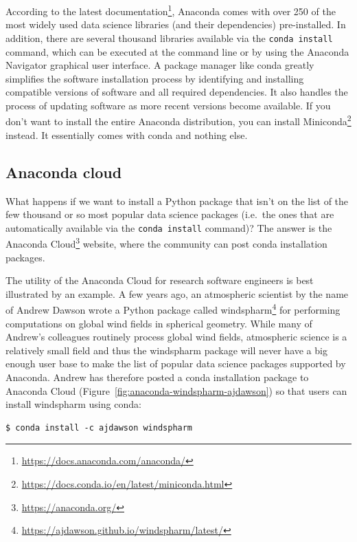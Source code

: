 \documentclass[
]{krantz}
\renewcommand{\href}[2]{#2\footnote{\url{#1}}}
\begin{document}
According to the \href{https://docs.anaconda.com/anaconda/}{latest documentation},
Anaconda comes with over 250 of the most widely used data science libraries (and their dependencies) pre-installed.
In addition, there are several thousand libraries available via the \texttt{conda\ install} command,
which can be executed at the command line or by using the Anaconda Navigator graphical user interface.
A package manager like conda greatly simplifies the software installation process
by identifying and installing compatible versions of software and all required dependencies.
It also handles the process of updating software as more recent versions become available.
If you don't want to install the entire Anaconda distribution,
you can install \href{https://docs.conda.io/en/latest/miniconda.html}{Miniconda} instead.
It essentially comes with conda and nothing else.

\hypertarget{anaconda-cloud}{%
\subsection{Anaconda cloud}\label{anaconda-cloud}}

What happens if we want to install a Python package
that isn't on the list of the few thousand or so most popular data science packages
(i.e.~the ones that are automatically available via the \texttt{conda\ install} command)?
The answer is the \href{https://anaconda.org/}{Anaconda Cloud} website,
where the community can post conda installation packages.

The utility of the Anaconda Cloud for research software engineers
is best illustrated by an example.
A few years ago, an atmospheric scientist by the name of Andrew Dawson
wrote a Python package called \href{https://ajdawson.github.io/windspharm/latest/}{windspharm}
for performing computations on global wind fields in spherical geometry.
While many of Andrew's colleagues routinely process global wind fields,
atmospheric science is a relatively small field and thus the windspharm package
will never have a big enough user base to make the list of
popular data science packages supported by Anaconda.
Andrew has therefore posted a conda installation package to Anaconda Cloud
(Figure~\ref{fig:anaconda-windspharm-ajdawson})
so that users can install windspharm using conda:

\begin{verbatim}
$ conda install -c ajdawson windspharm
\end{verbatim}
\end{document}
